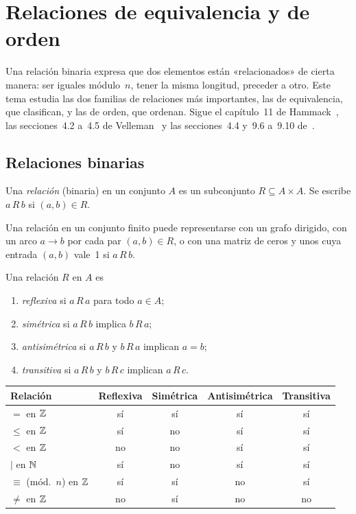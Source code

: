 \chapter{Relaciones de equivalencia y de orden}
\label{tema:5}

Una relación binaria expresa que dos elementos están «relacionados» de cierta manera: ser iguales módulo~$n$, tener la misma longitud, preceder a otro. Este tema estudia las dos familias de relaciones más importantes, las de equivalencia, que clasifican, y las de orden, que ordenan. Sigue el capítulo~11 de Hammack~\cite{hammack}, las secciones~4.2 a~4.5 de Velleman~\cite{velleman} y las secciones~4.4 y~9.6 a~9.10 de~\cite{mcs}.

\section{Relaciones binarias}

\begin{definicion}[Relación]
Una \emph{relación} (binaria) en un conjunto $A$ es un subconjunto $R\subseteq A\times A$. Se escribe $a\,R\,b$ si $(a,b)\in R$.
\end{definicion}

\addtocounter{definicion}{1}%

Una relación en un conjunto finito puede representarse con un grafo dirigido, con un arco $a\to b$ por cada par $(a,b)\in R$, o con una matriz de ceros y unos cuya entrada $(a,b)$ vale~1 si $a\,R\,b$.

\begin{definicion}[Propiedades]\label{def:t5-prop}
Una relación $R$ en $A$ es
\begin{enumerate}
  \item \emph{reflexiva} si $a\,R\,a$ para todo $a\in A$;
  \item \emph{simétrica} si $a\,R\,b$ implica $b\,R\,a$;
  \item \emph{antisimétrica} si $a\,R\,b$ y $b\,R\,a$ implican $a=b$;
  \item \emph{transitiva} si $a\,R\,b$ y $b\,R\,c$ implican $a\,R\,c$.
\end{enumerate}
\end{definicion}

\begin{center}\small
\begin{tabular}{@{}lcccc@{}}
\toprule
Relación & Reflexiva & Simétrica & Antisimétrica & Transitiva \\
\midrule
$=$ en $\mathbb{Z}$ & sí & sí & sí & sí \\
$\le$ en $\mathbb{Z}$ & sí & no & sí & sí \\
$<$ en $\mathbb{Z}$ & no & no & sí & sí \\
$\mid$ en $\mathbb{N}$ & sí & no & sí & sí \\
$\equiv$ (mód.\ $n$) en $\mathbb{Z}$ & sí & sí & no & sí \\
$\neq$ en $\mathbb{Z}$ & no & sí & no & no \\
\bottomrule
\end{tabular}
\end{center}


